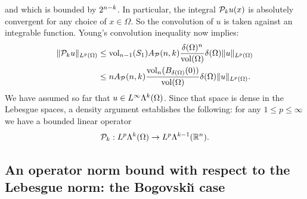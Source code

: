 \documentclass[10pt,a4paper]{article}
\newcommand\cye[1]{%
\protect\leavevmode
\begingroup
    \color{blue}%
    #1%
\endgroup
}
\begin{document}
and which is bounded by $2^{n-k}$. 
In particular, the integral ${\mathcal P}_{k} u(x)$ is absolutely convergent for any choice of $x \in \Omega$. 
So the convolution of $u$ is taken against an integrable function. 
Young's convolution inequality now implies: 
\begin{align*}
    \| {\mathcal P}_{k} u \|_{L^{p}(\Omega)}
    &
    \leq 
    \operatorname{vol}_{n-1}(S_1) A_{{\mathcal P}}(n,k) \frac{ {\delta}(\Omega)^{n} }{\operatorname{vol}(\Omega)} 
    {\delta}(\Omega)
    \| u \|_{L^{p}(\Omega)}
    \\&
    \leq 
    n A_{{\mathcal P}}(n,k) \frac{ \operatorname{vol}_{n}(B_{{\delta}(\Omega)}(0)) }{\operatorname{vol}(\Omega)} 
    {\delta}(\Omega)
    \| u \|_{L^{p}(\Omega)}
    .
\end{align*}
We have assumed so far that $u \in L^{\infty}\Lambda^{k}(\Omega)$. 
Since that space is dense in the Lebesgue spaces, a density argument establishes the following: 
for any $1 \leq p \leq \infty$ we have a bounded linear operator 
\begin{gather*}
    {\mathcal P}_{k} : L^{p}\Lambda^{k}(\Omega) \rightarrow L^{p}\Lambda^{k-1}({\mathbb R}^n).
\end{gather*}
% 


\subsection{\cye{An operator norm bound with respect to the Lebesgue norm: the Bogovski\u{\i} case}}
\end{document}
